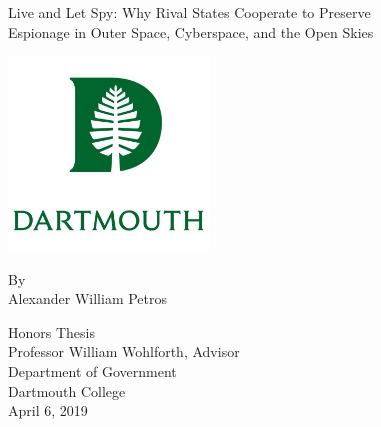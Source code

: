 
\begin{titlingpage}
\begin{center}
	\vspace*{0.5cm}
	\LARGE
	\SingleSpacing

	Live and Let Spy: Why Rival States Cooperate to Preserve\\
	Espionage in Outer Space, Cyberspace, and the Open Skies
	\vspace{1cm}

	\includegraphics[width=0.4\textwidth]{dartmouth-crest.jpg}

	\vspace{0.5cm}
	By\\
	Alexander William Petros



	\vfill
	\vspace{0.5cm}

	Honors Thesis\\
	Professor William Wohlforth, Advisor\\
	Department of Government\\
	Dartmouth College\\
	April 6, 2019

\end{center}
\end{titlingpage}
